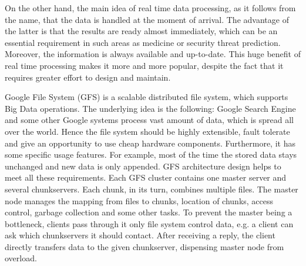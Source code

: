 On the other hand, the main idea of real time data processing, as it follows from the name, that the data is handled at the moment of arrival.
The advantage of the latter is that the results are ready almost immediately, which can be an essential requirement in such areas as medicine or security threat prediction. 
Moreover, the information is always available and up-to-date.
This huge benefit of real time processing makes it more and more popular, despite the fact that it requires greater effort to design and maintain. 


% 
% 
% 
Google File System (GFS) is a scalable distributed file system, which supports Big Data operations.
The underlying idea is the following: Google Search Engine and some other Google systems process vast amount of data, which is spread all over the world.
Hence the file system should be highly extensible, fault tolerate and give an opportunity to use cheap hardware components.
Furthermore, it has some specific usage features.
For example, most of the time the stored data stays unchanged and new data is only appended.
GFS architecture design helps to meet all these requirements.
Each GFS cluster contains one master server and several chunkservers.
Each chunk, in its turn, combines multiple files.
The master node manages the mapping from files to chunks, location of chunks, access control, garbage collection and some other tasks.
To prevent the master being a bottleneck, clients pass through it only file system control data, e.g. a client can ask which chunkservers it should contact.
After receiving a reply, the client directly transfers data to the given chunkserver, dispensing master node from overload. 
